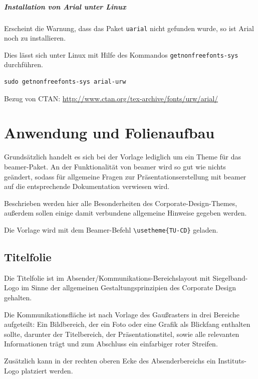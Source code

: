 \documentclass[cmyk,a4paper,colorscheme=green,TUBStitlepage=picture]{tubsreprt}
\begin{document}
\paragraph{Installation von Arial unter Linux}

Erscheint die Warnung, dass das Paket \lstinline{uarial} nicht gefunden wurde,
so ist Arial noch zu installieren.

Dies lässt sich unter Linux mit Hilfe des Kommandos
\lstinline{getnonfreefonts-sys} durchführen.

\begin{lstlisting}
sudo getnonfreefonts-sys arial-urw
\end{lstlisting}

Bezug von CTAN: \url{http://www.ctan.org/tex-archive/fonts/urw/arial/}


\chapter{Anwendung und Folienaufbau}

Grundsätzlich handelt es sich bei der Vorlage lediglich um ein Theme für
das beamer-Paket. An der Funktionalität von beamer wird so gut wie nichts
geändert, sodass für allgemeine Fragen zur Präsentationserstellung mit beamer
auf die entsprechende Dokumentation verwiesen wird. %

Beschrieben werden hier alle Besonderheiten des Corporate-Design-Themes, außerdem sollen
einige damit verbundene allgemeine Hinweise gegeben werden.

Die Vorlage wird mit dem Beamer-Befehl \lstinline!\usetheme{TU-CD}! geladen.

\section{Titelfolie}

Die Titelfolie ist im Absender/Kommunikations-Bereichslayout mit
Siegelband-Logo im Sinne der allgemeinen Gestaltungsprinzipien des
Corporate Design gehalten.

Die Kommunikationsfläche ist nach Vorlage des Gaußrasters %
in drei Bereiche aufgeteilt:
Ein Bildbereich, der ein Foto oder eine Grafik als Blickfang enthalten
sollte,
darunter der Titelbereich, der Präsentationstitel, sowie alle relevanten
Informationen trägt
und zum Abschluss ein einfarbiger roter Streifen.

Zusätzlich kann in der rechten oberen Ecke des Absenderbereichs ein
Instituts-Logo platziert werden.
\end{document}
